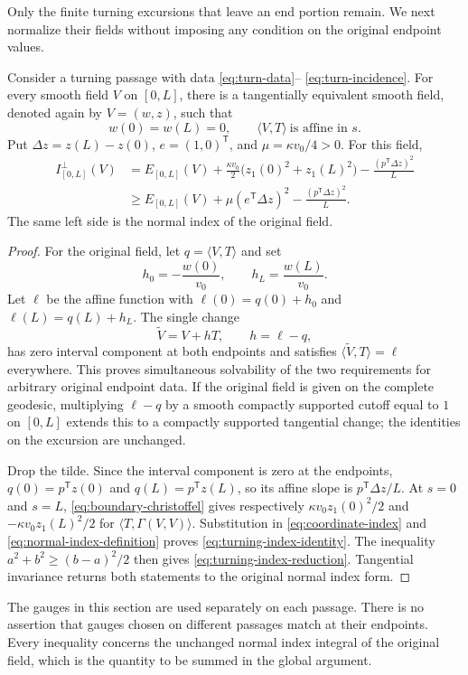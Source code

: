Only the finite turning excursions that leave an end portion remain.
We next normalize their fields without imposing any condition on the
original endpoint values.

\begin{lemma}\label{lem:turning-gauge}
Consider a turning passage with data \eqref{eq:turn-data}--
\eqref{eq:turn-incidence}.  For every smooth field $V$ on $[0,L]$,
there is a tangentially equivalent smooth field, denoted again by
$V=(w,z)$, such that
\[
 w(0)=w(L)=0,\qquad \langle V,T\rangle\ \text{is affine in }s.
\]
Put $\Delta z=z(L)-z(0)$, $e=(1,0)^{\mathsf T}$, and
$\mu=\kappa v_0/4>0$.  For this field,
\begin{align}
 I_{[0,L]}^\perp(V)
 &=E_{[0,L]}(V)+\frac{\kappa v_0}{2}
       \bigl(z_1(0)^2+z_1(L)^2\bigr)
       -\frac{(p^{\mathsf T}\Delta z)^2}{L}
       \label{eq:turning-index-identity}\\
 &\ge E_{[0,L]}(V)+\mu(e^{\mathsf T}\Delta z)^2
       -\frac{(p^{\mathsf T}\Delta z)^2}{L}.
       \label{eq:turning-index-reduction}
\end{align}
The same left side is the normal index of the original field.
\end{lemma}

\begin{proof}
For the original field, let $q=\langle V,T\rangle$ and set
\[
 h_0=-\frac{w(0)}{v_0},\qquad h_L=\frac{w(L)}{v_0}.
\]
Let $\ell$ be the affine function with
$\ell(0)=q(0)+h_0$ and $\ell(L)=q(L)+h_L$.
The single change
\[
 \widetilde V=V+hT,\qquad h=\ell-q,
\]
has zero interval component at both endpoints and satisfies
$\langle\widetilde V,T\rangle=\ell$ everywhere.
This proves simultaneous solvability of the two requirements for
arbitrary original endpoint data.  If the original field is given on
the complete geodesic, multiplying $\ell-q$ by a smooth compactly
supported cutoff equal to $1$ on $[0,L]$ extends this to a compactly
supported tangential change; the identities on the excursion are
unchanged.

Drop the tilde.  Since the interval component is zero at the
endpoints, $q(0)=p^{\mathsf T}z(0)$ and
$q(L)=p^{\mathsf T}z(L)$, so its affine slope is
$p^{\mathsf T}\Delta z/L$.
At $s=0$ and $s=L$, \eqref{eq:boundary-christoffel} gives respectively
$\kappa v_0z_1(0)^2/2$ and $-\kappa v_0z_1(L)^2/2$ for
$\langle T,\Gamma(V,V)\rangle$.
Substitution in \eqref{eq:coordinate-index} and
\eqref{eq:normal-index-definition} proves
\eqref{eq:turning-index-identity}.  The inequality
$a^2+b^2\ge(b-a)^2/2$ then gives
\eqref{eq:turning-index-reduction}.
Tangential invariance returns both statements to the original
normal index form.
\end{proof}

The gauges in this section are used separately on each passage.
There is no assertion that gauges chosen on different passages match
at their endpoints.  Every inequality concerns the unchanged normal
index integral of the original field, which is the quantity to be
summed in the global argument.
